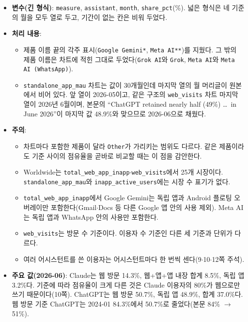 \documentclass[11pt]{article}
\begin{document}
\begin{itemize}
  \item \textbf{변수(긴 형식)}: \texttt{measure}, \texttt{assistant}, \texttt{month}, \texttt{share\_pct}(\%). 넓은 형식은 네 기준의 월을 모두 열로 두고, 기간이 없는 칸은 비워 두었다.
  \item \textbf{처리 내용}:
  \begin{itemize}
    \item 제품 이름 끝의 각주 표시(\texttt{Google Gemini*}, \texttt{Meta AI**})를 지웠다. 그 밖의 제품 이름은 차트에 적힌 그대로 두었다(\texttt{Grok AI}와 \texttt{Grok}, \texttt{Meta AI}와 \texttt{Meta AI (WhatsApp)}).
    \item \texttt{standalone\_app\_mau} 차트는 값이 30개월인데 마지막 열의 월 머리글이 원본에서 비어 있다. 앞 열이 2026-05이고, 같은 구조의 \texttt{web\_visits} 차트 마지막 열이 2026년 6월이며, 본문의 ``ChatGPT retained nearly half (49\%) \ldots\ in June 2026''이 마지막 값 48.9\%와 맞으므로 2026-06으로 채웠다.
  \end{itemize}
  \item \textbf{주의}:
  \begin{itemize}
    \item 차트마다 포함한 제품이 달라 \texttt{Other}가 가리키는 범위도 다르다. 같은 제품이라도 기준 사이의 점유율을 곧바로 비교할 때는 이 점을 감안한다.
    \item Worldwide는 \texttt{total\_web\_app\_inapp}$\cdot$\texttt{web\_visits}에서 25개 시장이다. \texttt{standalone\_app\_mau}와 \texttt{inapp\_active\_users}에는 시장 수 표기가 없다.
    \item \texttt{total\_web\_app\_inapp}에서 Google Gemini는 독립 앱과 Android 플로팅 오버레이만 포함한다(Gmail$\cdot$Docs 등 다른 Google 앱 안의 사용 제외). Meta AI는 독립 앱과 WhatsApp 안의 사용만 포함한다.
    \item \texttt{web\_visits}는 방문 수 기준이다. 이용자 수 기준인 다른 세 기준과 단위가 다르다.
    \item 여러 어시스턴트를 쓴 이용자는 어시스턴트마다 한 번씩 센다(9$\cdot$10$\cdot$12쪽 주석).
  \end{itemize}
  \item \textbf{주요 값(2026-06)}: Claude는 웹 방문 14.3\%, 웹+앱+앱 내장 합계 8.5\%, 독립 앱 3.2\%다. 기준에 따라 점유율이 크게 다른 것은 Claude 이용자의 80\%가 웹으로만 쓰기 때문이다(10쪽). ChatGPT는 웹 방문 50.7\%, 독립 앱 48.9\%, 합계 37.0\%다. 웹 방문 기준 ChatGPT는 2024-01 84.3\%에서 50.7\%로 줄었다(본문 84\% $\to$ 51\%).
\end{itemize}
\end{document}
